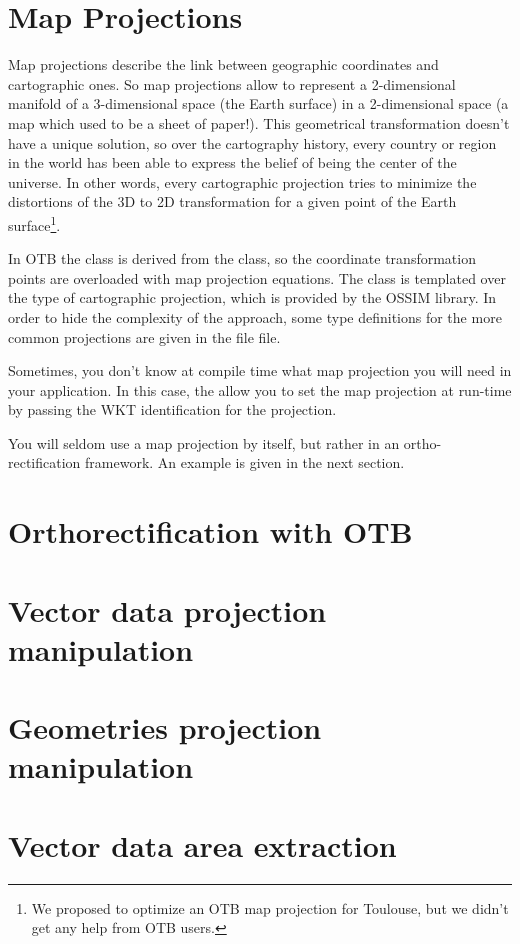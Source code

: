 

\section{Map Projections}
\ifitkFullVersion
\label{sec:MapProjections}
\fi

Map projections describe the link between geographic coordinates and
cartographic ones. So map projections allow to represent a 2-dimensional manifold of a
3-dimensional space (the Earth surface) in a 2-dimensional space (a
map which used to be a sheet of paper!). This geometrical
transformation doesn't have a unique solution, so over the cartography
history, every country or region in the world has been able to express
the belief of being the center of the universe. In other words, every
cartographic projection tries to minimize the distortions of the 3D to
2D transformation for a given point of the Earth surface\footnote{We
  proposed to optimize an OTB map projection for Toulouse, but we
  didn't get any help from OTB users.}.

In OTB the  class is derived from the
 class, so the coordinate transformation
points are overloaded with map projection equations. The
 class is templated over the type of
cartographic projection, which is provided by the OSSIM library. In
order to hide the complexity of the approach, some type definitions
for the more common projections are given in the file
 file.

Sometimes, you don't know at compile time what map projection you will need in
your application. In this case, the 
allow you to set the map projection at run-time by passing the WKT identification
for the projection.



You will seldom use a map projection by itself, but rather in an
ortho-rectification framework. An example is given in the next section.




\section{Orthorectification with OTB}
\ifitkFullVersion
\label{sec:OrthorectificationwithOTB}
\fi


\section{Vector data projection manipulation}
\ifitkFullVersion
\label{sec:VectorDataProjection}
\fi


\section{Geometries projection manipulation}
\ifitkFullVersion
\label{sec:GeometriesProjection}
\fi


\section{Vector data area extraction}
\ifitkFullVersion
\label{sec:VectorDataProjection}
\fi

